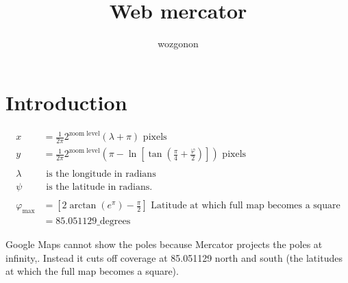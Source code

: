\documentclass[11pt]{article} %
\title{Web mercator}
\author{wozgonon}
\date{} %
\begin{document}
\maketitle

\section{Introduction}



\begin{align*}
  x &= \frac{1}{2\pi} 2^{\text{zoom level}} (\lambda + \pi) \text{\ pixels} \\
  y &= \frac{1}{2\pi} 2^{\text{zoom level}} \left(\pi - \ln \left[\tan \left(\frac{\pi}{4} + \frac{\varphi}{2} \right) \right]\right) \text{\ pixels} \\
\\
\lambda & \text{\ is the longitude in radians} \\
\psi & \text{\ is the latitude in radians.} \\
\\
\varphi_{\text{max}} &= \left[2\arctan(e^{\pi}) - \frac{\pi}{2}\right]    \text{\ Latitude at which full map becomes a square} \\
&= 85.051129 \text{\_degrees}
\end{align*}

Google Maps cannot show the poles because Mercator projects the poles at infinity,. Instead it cuts off coverage at 85.051129 north and south (the latitudes at which the full map becomes a square).
\end{document}
